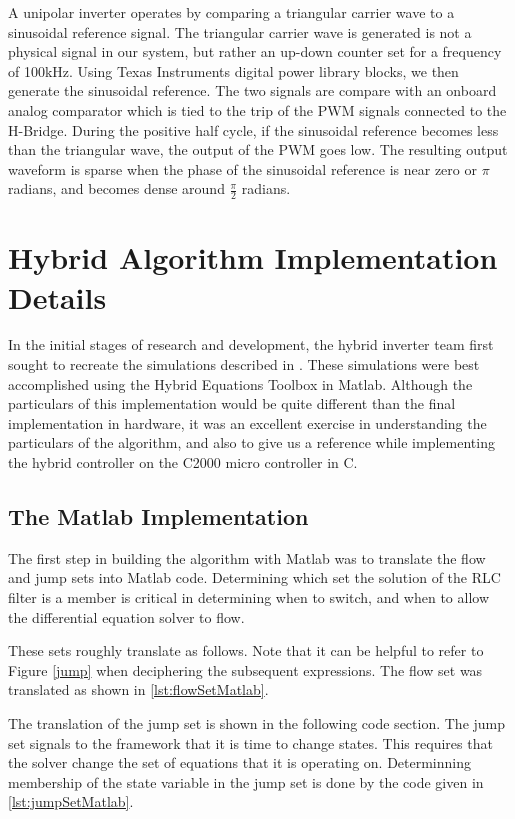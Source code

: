 A unipolar inverter operates by comparing a triangular carrier wave to a sinusoidal reference signal. The triangular carrier wave is generated is not a physical signal in our system, but rather an up-down counter set for a frequency of 100kHz. Using Texas Instruments digital power library blocks, we then generate the sinusoidal reference. The two signals are compare with an onboard analog comparator which is tied to the trip of the PWM signals connected to the H-Bridge. During the positive half cycle, if the sinusoidal reference becomes less than the triangular wave, the output of the PWM goes low. The resulting output waveform is sparse when the phase of the sinusoidal reference is near zero or $\pi$ radians, and becomes dense around $\frac{\pi}{2}$ radians. 

\section{Hybrid Algorithm Implementation Details}
In the initial stages of research and development, the hybrid inverter team first sought to recreate the simulations described in \cite{ricardo}. These simulations were best accomplished using the Hybrid Equations Toolbox in Matlab. Although the particulars of this implementation would be quite different than the final implementation in hardware, it was an excellent exercise in understanding the particulars of the algorithm, and also to give us a reference while implementing the hybrid controller on the C2000 micro controller in C. 

\subsection{The Matlab Implementation}
The first step in building the algorithm with Matlab was to translate the flow and jump sets into Matlab code. Determining which set the solution of the RLC filter is a member is critical in determining when to switch, and when to allow the differential equation solver to flow. 

These sets roughly translate as follows. Note that it can be helpful to refer to Figure \ref{jump} when deciphering the subsequent expressions. The flow set was translated as shown in \ref{lst:flowSetMatlab}.

The translation of the jump set is shown in the following code section. The jump set signals to the framework that it is time to change states. This requires that the solver change the set of equations that it is operating on. Determinning membership of the state variable in the jump set is done by the code given in \ref{lst:jumpSetMatlab}.

